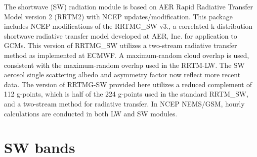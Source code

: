 The shortwave (SW) radiation module is based on A\+ER Rapid Radiative Transfer Model version 2 (R\+R\+T\+M2) with N\+C\+EP updates/modification. This package includes N\+C\+EP modifications of the R\+R\+T\+M\+G\+\_\+\+SW v3., a correlated k-\/distribution shortwave radiative transfer model developed at A\+ER, Inc. for application to G\+C\+Ms. This version of R\+R\+T\+M\+G\+\_\+\+SW utilizes a two-\/stream radiative transfer method as implemented at E\+C\+M\+WF. A maximum-\/random cloud overlap is used, consistent with the maximum-\/random overlap used in the R\+R\+T\+M-\/\+LW. The SW aerosol single scattering albedo and asymmetry factor now reflect more recent data. The version of R\+R\+T\+M\+G-\/\+SW provided here utilizes a reduced complement of 112 g-\/points, which is half of the 224 g-\/points used in the standard R\+R\+T\+M\+\_\+\+SW, and a two-\/stream method for radiative transfer. In N\+C\+EP N\+E\+M\+S/\+G\+SM, hourly calculations are conducted in both LW and SW modules.\hypertarget{SW_RRTMG}{}\section{S\+W bands}\label{SW_RRTMG}
 
